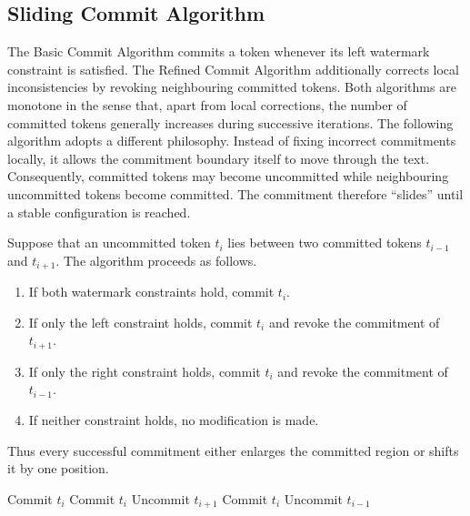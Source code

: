 \documentclass[a4paper,11pt]{llncs}
\begin{document}
\subsection{Sliding Commit Algorithm}
\label{sec:sliding}

The Basic Commit Algorithm commits a token whenever its left watermark
constraint is satisfied. The Refined Commit Algorithm additionally
corrects local inconsistencies by revoking neighbouring committed tokens.
Both algorithms are monotone in the sense that, apart from local
corrections, the number of committed tokens generally increases during
successive iterations.
%
The following algorithm adopts a different philosophy. Instead of fixing
incorrect commitments locally, it allows the commitment boundary itself
to move through the text. Consequently, committed tokens may become
uncommitted while neighbouring uncommitted tokens become committed.
The commitment therefore ``slides'' until a stable configuration is
reached.


Suppose that an uncommitted token $t_i$ lies between two committed
tokens $t_{i-1}$ and $t_{i+1}$.
The algorithm proceeds as follows.
\begin{enumerate}
\item
If both watermark constraints hold, commit $t_i$.
\item
If only the left constraint holds, commit $t_i$ and revoke the
commitment of $t_{i+1}$.
\item
If only the right constraint holds, commit $t_i$ and revoke the
commitment of $t_{i-1}$.
\item
If neither constraint holds, no modification is made.
\end{enumerate}
%
Thus every successful commitment either enlarges the committed region
or shifts it by one position. 
%
\begin{algorithm}[H]
\caption{Sliding Commit Algorithm}
\label{alg:sliding}
\begin{algorithmic}[1]
\Repeat
{}
        \State Commit $t_i$
        \State Commit $t_i$
        \State Uncommit $t_{i+1}$
        \State Commit $t_i$
        \State Uncommit $t_{i-1}$
    \EndIf
\EndFor
{}
\end{algorithmic}
\end{algorithm}
\end{document}
